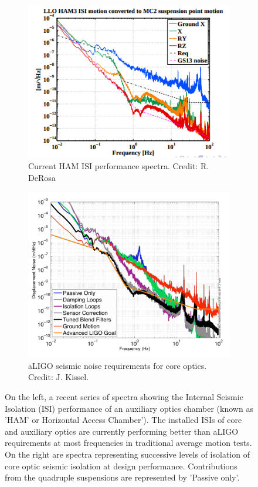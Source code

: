 \begin{figure}[htb]
\centering
\begin{subfigure}{.5\textwidth}
  \centering
  \includegraphics[width=\linewidth]{figures/Current_HAM_ISI_performance.png}
  \caption{Current HAM ISI performance spectra. Credit: R. DeRosa}
  \label{fig:HAM_ISI_current}
\end{subfigure}%
\begin{subfigure}{.5\textwidth}
  \centering
  \includegraphics[width=\linewidth]{figures/SEI_SUS_spectra.png}
  \caption{aLIGO seismic noise requirements for core optics. Credit: J. Kissel.}
  \label{fig:SEISUS_spectra}
\end{subfigure}
\caption{On the left, a recent series of spectra showing the Internal Seismic Isolation (ISI) performance of an auxiliary optics chamber (known as 'HAM' or Horizontal Access Chamber'). The installed ISIs of core and auxiliary optics are currently performing better than aLIGO requirements at most frequencies in traditional average motion tests. 
On the right are spectra representing successive levels of isolation of core optic seismic isolation at design performance. Contributions from the quadruple suspensions are represented by 'Passive only'.}
\label{fig:test}
\end{figure}

